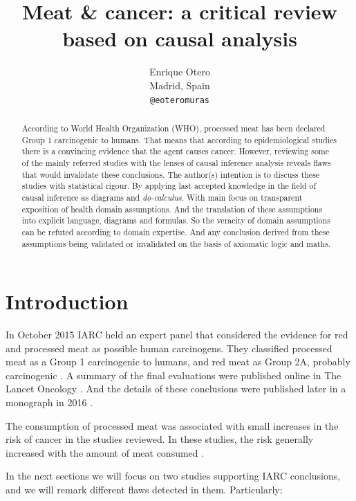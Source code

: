 \documentclass{article}
\title{Meat \& cancer: a critical review based on causal analysis %
}
\author{
 Enrique Otero \\
  Madrid, Spain\\
  \texttt{@eoteromuras}
}
\begin{document}
\maketitle

\begin{abstract}
According to World Health Organization (WHO), processed meat has been declared Group 1 carcinogenic to humans. That means that according to epidemiological studies there is a convincing evidence that the agent causes cancer. However, reviewing some of the mainly referred studies with the lenses of causal inference analysis reveals %
flaws that would invalidate these conclusions. The author(s) intention is to discuss these studies with statistical rigour. By applying last accepted knowledge in the field of causal inference as diagrams and \textit{do-calculus}. With main focus on transparent exposition of health domain assumptions. And the translation of these assumptions into explicit language, diagrams and formulas. So the veracity of domain assumptions can be refuted according to domain expertise. And any conclusion derived from these assumptions being validated or invalidated on the basis of axiomatic logic and maths.

\end{abstract}




\section{Introduction}
 In October 2015 IARC held an expert panel that considered the evidence for red and processed meat as possible human carcinogens. They classified processed meat as a Group 1 carcinogenic to humans, and red meat as Group 2A, probably carcinogenic \cite{whoint}. A summary of the final evaluations were published online in The Lancet Oncology \cite{lancet}. And the details of these conclusions were published later in a monograph in 2016 \cite{monograph}.

The consumption of processed meat was associated with small increases in the risk of cancer in the studies reviewed. In these studies, the risk generally increased with the amount of meat consumed \cite{whoint}.


In the next sections we will focus on two studies supporting IARC conclusions, and we will remark different flaws detected in them. Particularly:
\end{document}
